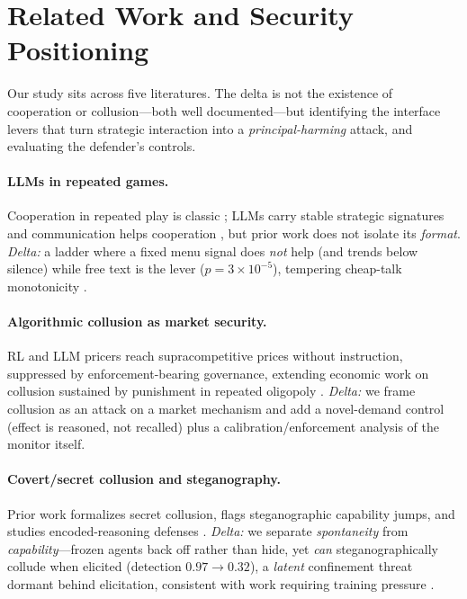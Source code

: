 \documentclass[runningheads]{llncs}
\begin{document}
\section{Related Work and Security Positioning}
\label{sec:related_work}

Our study sits across five literatures. The delta is not the existence of
cooperation or collusion---both well documented---but identifying the interface
levers that turn strategic interaction into a \emph{principal-harming} attack, and
evaluating the defender's controls.

\paragraph{LLMs in repeated games.}
Cooperation in repeated play is classic \cite{axelrod1984evolution}; LLMs carry
stable strategic signatures and communication helps cooperation
\cite{akata2025repeated,herr2024strategic,duan2024gtbench,costarelli2024gamebench,buscemi2025fairgame,madmoun2025communication,shaki2026folk,affonso2026converge},
but prior work does not isolate its \emph{format}. \emph{Delta:} a ladder where a
fixed menu signal does \emph{not} help (and trends below silence) while free text
is the lever ($p{=}3{\times}10^{-5}$), tempering cheap-talk monotonicity
\cite{sally1995conversation}.

\paragraph{Algorithmic collusion as market security.}
RL and LLM pricers reach supracompetitive prices without instruction, suppressed by
enforcement-bearing governance, extending economic work on collusion sustained by
punishment in repeated oligopoly
\cite{rotemberg1986pricewars,calvano2020ai,ezrachi2017collusion,fish2024algorithmic,lin2024strategic,agrawal2025double,keppo2026fragility,bracale2026institutional}.
\emph{Delta:} we frame collusion as an attack on a market mechanism and add a
novel-demand control (effect is reasoned, not recalled) plus a
calibration/enforcement analysis of the monitor itself.

\paragraph{Covert/secret collusion and steganography.}
Prior work formalizes secret collusion, flags steganographic capability jumps, and
studies encoded-reasoning defenses
\cite{motwani2024secret,jarviniemi2025subversion,roger2023preventing,zolkowski2025early}.
\emph{Delta:} we separate \emph{spontaneity} from \emph{capability}---frozen agents
back off rather than hide, yet \emph{can} steganographically collude when elicited
(detection $0.97\!\to\!0.32$), a \emph{latent} confinement
threat~\cite{lampson1973confinement} dormant behind elicitation, consistent with
work requiring training pressure \cite{lazaridou2017emergence,lewis2017deal}.
\end{document}
